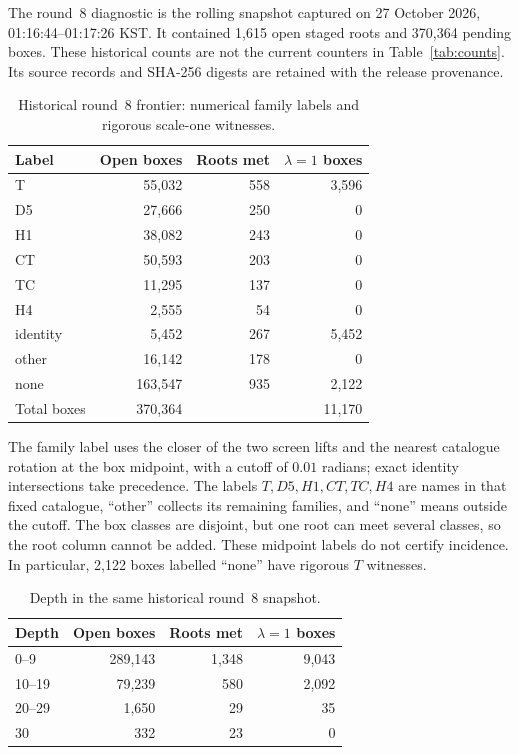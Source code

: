 The round~8 diagnostic is the rolling snapshot captured on
27 October 2026, 01:16:44--01:17:26 KST. It contained 1,615 open staged
roots and 370,364 pending boxes. These historical counts are not the
current counters in Table~\ref{tab:counts}. Its source records and
SHA-256 digests are retained with the release provenance.

\begin{table}[ht]
\centering\small
\caption{Historical round~8 frontier: numerical family labels and
rigorous scale-one witnesses.}
\label{tab:frontier-family}
\begin{tabular}{@{}lrrr@{}}
\toprule
Label & Open boxes & Roots met & $\lambda=1$ boxes\\
\midrule
T & 55,032 & 558 & 3,596\\
D5 & 27,666 & 250 & 0\\
H1 & 38,082 & 243 & 0\\
CT & 50,593 & 203 & 0\\
TC & 11,295 & 137 & 0\\
H4 & 2,555 & 54 & 0\\
identity & 5,452 & 267 & 5,452\\
other & 16,142 & 178 & 0\\
none & 163,547 & 935 & 2,122\\
\midrule
Total boxes & 370,364 & & 11,170\\
\bottomrule
\end{tabular}
\end{table}

The family label uses the closer of the two screen lifts and the nearest
catalogue rotation at the box midpoint, with a cutoff of $0.01$ radians;
exact identity intersections take precedence. The labels $T,D5,H1,CT,TC,H4$
are names in that fixed catalogue, ``other'' collects its remaining
families, and ``none'' means outside the cutoff. The box classes are
disjoint, but one root can meet several classes, so the root column
cannot be added. These midpoint labels do not certify incidence. In
particular, 2,122 boxes labelled ``none'' have rigorous $T$ witnesses.

\begin{table}[ht]
\centering\small
\caption{Depth in the same historical round~8 snapshot.}
\label{tab:frontier-depth}
\begin{tabular}{@{}lrrr@{}}
\toprule
Depth & Open boxes & Roots met & $\lambda=1$ boxes\\
\midrule
0--9 & 289,143 & 1,348 & 9,043\\
10--19 & 79,239 & 580 & 2,092\\
20--29 & 1,650 & 29 & 35\\
30 & 332 & 23 & 0\\
\bottomrule
\end{tabular}
\end{table}

